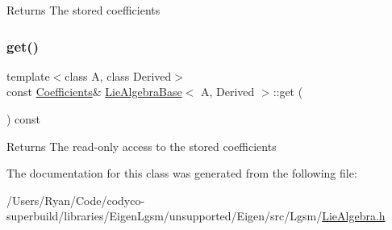 \begin{DoxyReturn}{Returns}
The stored coefficients 
\end{DoxyReturn}
\hypertarget{class_lie_algebra_base_aa54c9478545ff1e222217a3bc19ec5d2}{}\label{class_lie_algebra_base_aa54c9478545ff1e222217a3bc19ec5d2} 
\subsubsection{\texorpdfstring{get()}{get()}\hspace{0.1cm}{\footnotesize\ttfamily [2/2]}}
{\footnotesize\ttfamily template$<$class A, class Derived$>$ \\
const \hyperlink{class_lie_algebra_base_a8e61a02d3c5f7a0b4bd87a4ccd47dc9a}{Coefficients}\& \hyperlink{class_lie_algebra_base}{Lie\+Algebra\+Base}$<$ A, Derived $>$\+::get (\begin{DoxyParamCaption}{ }\end{DoxyParamCaption}) const\hspace{0.3cm}{\ttfamily [inline]}}

\begin{DoxyReturn}{Returns}
The read-\/only access to the stored coefficients 
\end{DoxyReturn}


The documentation for this class was generated from the following file\+:\begin{DoxyCompactItemize}
\item 
/\+Users/\+Ryan/\+Code/codyco-\/superbuild/libraries/\+Eigen\+Lgsm/unsupported/\+Eigen/src/\+Lgsm/\hyperlink{_lie_algebra_8h}{Lie\+Algebra.\+h}\end{DoxyCompactItemize}
